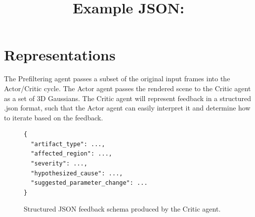 \section{Representations}
\label{sec:representations}

The Prefiltering agent passes a subset of the original input frames into the Actor/Critic cycle. The Actor agent passes the rendered scene to the Critic agent as a set of 3D Gaussians. The Critic agent will represent feedback in a structured .json format, such that the Actor agent can easily interpret it and determine how to iterate based on the feedback.

\newpage
\title{Example JSON:}
\begin{figure}[h]
\centering
\begin{verbatim}
{
  "artifact_type": ...,
  "affected_region": ...,
  "severity": ...,
  "hypothesized_cause": ...,
  "suggested_parameter_change": ...
}
\end{verbatim}
\caption{Structured JSON feedback schema produced by the Critic agent.}
\label{fig:json-schema}
\end{figure}